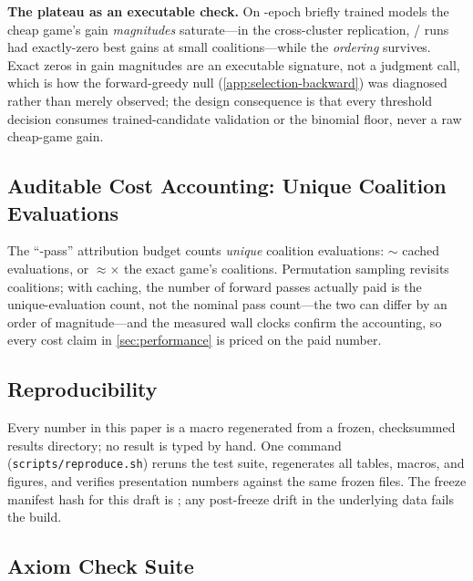 \textbf{The plateau as an executable check.} On
\unfrozen{\ResStemEpochs}-epoch briefly trained models the cheap
game's gain
\emph{magnitudes} saturate---in the cross-cluster replication,
\unfrozen{\ResPlateauZeroCells}/\unfrozen{\ResPlateauTotalCells} runs
had exactly-zero best gains at small coalitions---while the
\emph{ordering} survives. Exact zeros in gain magnitudes are an
executable signature, not a judgment call, which is how the
forward-greedy null (\cref{app:selection-backward}) was diagnosed
rather than merely observed; the design consequence is that every
threshold decision consumes trained-candidate validation or the
binomial floor, never a raw cheap-game gain.

\subsection{Auditable Cost Accounting: Unique Coalition Evaluations}
\label{app:accounting}

The ``\unfrozen{\ResSampledPasses}-pass'' attribution budget counts
\emph{unique} coalition evaluations:
$\sim$\unfrozen{\ResUniqueEvals} cached evaluations, or
$\approx$\unfrozen{\ResUniqueEvalFraction}$\times$ the exact game's
\unfrozen{\ResExactGameCoalitions} coalitions. Permutation sampling
revisits coalitions; with caching, the number of forward passes
actually paid is the unique-evaluation count, not the nominal pass
count---the two can differ by an order of magnitude---and the measured
wall clocks confirm the accounting, so every cost claim in
\cref{sec:performance} is priced on the paid number.

\subsection{Reproducibility}
\label{app:reproducibility}

Every number in this paper is a macro regenerated from a frozen,
checksummed results directory; no result is typed by hand. One command
(\texttt{scripts/reproduce.sh}) reruns the test suite, regenerates all
tables, macros, and figures, and verifies presentation numbers against
the same frozen files. The freeze manifest hash for this draft is
\texttt{\ResManifestHash}; any post-freeze drift in the underlying data
fails the build.

\subsection{Axiom Check Suite}
